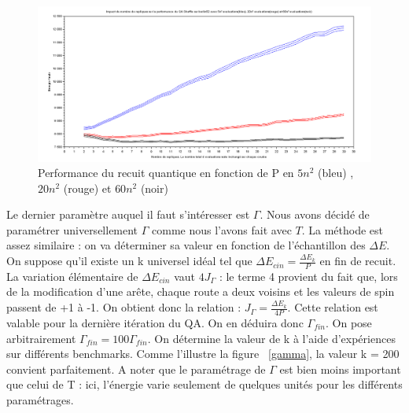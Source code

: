 \documentclass{article}%
\begin{document}
	\begin{figure}[!h]
	\begin{center}
	\includegraphics[scale=0.25]{berlin52_nbRepliques.png}
	\caption{Performance du recuit quantique en fonction de P en $ 5n^2 $ (bleu) , $ 20n^2 $ (rouge) et $ 60n^2 $ (noir)}
	\label{berlin52_nbRepliques}
	\end{center}
	\end{figure}
	
	\vspace{1cm}
	
	Le dernier paramètre auquel il faut s'intéresser est $ \Gamma $. Nous avons décidé de paramétrer universellement $ \Gamma $ comme nous l'avons fait avec $ T $. La méthode est assez similaire : on va déterminer sa valeur en fonction de l'échantillon des $ \Delta E $. On suppose qu'il existe un k universel idéal tel que $ \Delta E_{cin} = \frac{\Delta E_{k}}{P} $ en fin de recuit. La variation élémentaire de $ \Delta E_{cin} $ vaut $ 4J_{\Gamma} $ : le terme 4 provient du fait que, lors de la modification d'une arête, chaque route a deux voisins et les valeurs de spin passent de +1 à -1. On obtient donc la relation : $ J_{\Gamma} = \frac{\Delta E_{k}}{4P} $. Cette relation est valable pour la dernière itération du QA. On en déduira donc $ \Gamma_{fin} $. On pose arbitrairement $ \Gamma_{fin} = 100\Gamma_{fin} $. 
	On détermine la valeur de k à l'aide d'expériences sur différents benchmarks. Comme l'illustre la figure ~\ref{gamma}, la valeur k = 200 convient parfaitement. A noter que le paramétrage de $ \Gamma $ est bien moins important que celui de T : ici, l'énergie varie seulement de quelques unités pour les différents paramétrages.
	
\end{document}

